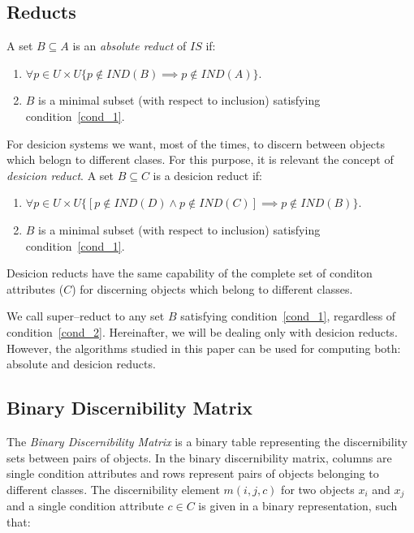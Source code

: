 \documentclass[number,preprint,review,12pt]{elsarticle}
\begin{document}
\subsection{Reducts}\label{def_reduct}
  A set $B \subseteq A$ is an \textit{absolute reduct} of $IS$ if:
  \begin{enumerate}
  	\item $\forall p \in U\times U \lbrace p \notin IND(B) \implies p \notin IND(A)\rbrace$. \label{cond_1}
  	\item $B$ is a minimal subset (with respect to inclusion) satisfying condition~\ref{cond_1}.\label{cond_2}
  \end{enumerate}
 
  
  For desicion systems we want, most of the times, to discern between objects which belogn to different clases. For this purpose, it is relevant the concept of \textit{desicion reduct}. A set $B \subseteq C$ is a desicion reduct if:
  \begin{enumerate}
   	\item $\forall p \in U\times U \lbrace [p \notin IND(D) \wedge p \notin IND(C)] \implies p \notin IND(B)\rbrace$. \label{cond_1}
   	\item $B$ is a minimal subset (with respect to inclusion) satisfying condition~\ref{cond_1}.\label{cond_2}
  \end{enumerate}
  
  Desicion reducts have the same capability of the complete set of conditon attributes ($C$) for discerning objects which belong to different classes.
   
  We call super--reduct to any set $B$ satisfying condition~\ref{cond_1}, regardless of condition~\ref{cond_2}. Hereinafter, we will be dealing only with desicion reducts. However, the algorithms studied in this paper can be used for computing both: absolute and desicion reducts.
  
%  
\subsection{Binary Discernibility Matrix}
  The \textit{Binary Discernibility Matrix} is a binary table representing the discernibility sets between pairs 
  of objects. In the binary discernibility matrix, columns are single condition attributes and rows represent pairs of objects belonging to different classes. The discernibility element $m(i, j, c)$ for two objects $x_i$ and $x_j$ and a single condition attribute $c \in C$ is given in a binary representation, such that:
  
\end{document}
